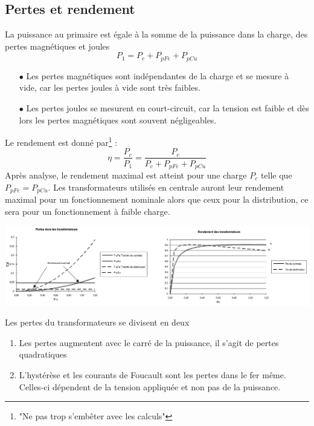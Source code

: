 	\subsection{Pertes et rendement}
	La puissance au primaire est égale à la somme de la puissance dans la charge, 
	des pertes magnétiques et joules
	\begin{equation}
	P_1 = P_c + P_{pFe}  + P_{pCu}
	\end{equation}
	\begin{itemize}
	\item[$\bullet$] Les pertes magnétiques sont indépendantes de la charge et 
	se mesure à vide, car les pertes joules à vide sont très faibles.
	\item[$\bullet$] Les pertes joules se mesurent en court-circuit, car la tension 
	est faible et dès lors les pertes magnétiques sont souvent négligeables.
	\end{itemize}
	Le rendement est donné par\footnote{"Ne pas trop s'embêter avec les calculs"} :
	\begin{equation}
	\eta = \dfrac{P_c}{P_1} = \dfrac{P_c}{P_c+P_{pFe} + P_{pCu}}
	\end{equation}
	Après analyse, le rendement maximal est atteint pour une charge $P_c$ telle 
	que $P_{pFe} = P_{pCu}$. Les transformateurs utilisés en centrale auront leur rendement maximal pour un fonctionnement nominale alors que ceux pour la distribution, ce sera pour un fonctionnement à faible charge. 
	
	\begin{center}
	\includegraphics[scale=0.35]{ch3/imager4.png}
	\end{center}
	Les pertes du transformateurs se divisent en deux
	\begin{enumerate}
	\item Les pertes augmentent avec le carré de la puissance, il s'agit de pertes
	quadratiques
	\item L'hystérèse et les courants de Foucault sont les pertes dans le fer même. 
	Celles-ci dépendent de la tension appliquée et non pas de la puissance.
	\end{enumerate}
\newpage	
